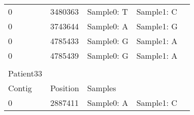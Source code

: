 \begin{longtable}{|l|l|l|l|l|}
	\cline{1-4}
	0                              & 3480363              & Sample0: T                  & Sample1: C           & \multicolumn{1}{l}{}  \\ 
	\cline{1-4}
	0                              & 3743644              & Sample0: A                  & Sample1: G           & \multicolumn{1}{l}{}  \\ 
	\cline{1-4}
	0                              & 4785433              & Sample0: G                  & Sample1: A           & \multicolumn{1}{l}{}  \\ 
	\cline{1-4}
	0                              & 4785439              & Sample0: G                  & Sample1: A           & \multicolumn{1}{l}{}  \\ 
	\cline{1-4}
	\multicolumn{1}{l}{}           & \multicolumn{1}{l}{} & \multicolumn{1}{l}{}        & \multicolumn{1}{l}{} & \multicolumn{1}{l}{}  \\ 
	\cline{1-4}
	\multicolumn{1}{|l}{Patient33} & \multicolumn{1}{l}{} & \multicolumn{1}{l}{}        &                      & \multicolumn{1}{l}{}  \\ 
	\cline{1-4}
	Contig                         & Position             & \multicolumn{1}{l}{Samples} &                      & \multicolumn{1}{l}{}  \\ 
	\cline{1-4}
	0                              & 2887411              & Sample0: A                  & Sample1: C           & \multicolumn{1}{l}{}  \\
	\cline{1-4}
\end{longtable}